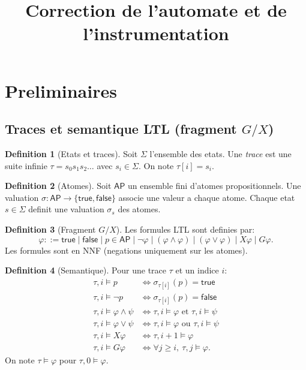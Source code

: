 \documentclass[11pt]{article}
\title{Correction de l'automate et de l'instrumentation}
\author{}
\date{}
\newcommand{\AP}{\mathsf{AP}}
\newcommand{\eval}{\models}
\theoremstyle{definition}
\newtheorem{definition}{Definition}
\begin{document}
\maketitle

\section{Preliminaires}

\subsection{Traces et semantique LTL (fragment $G/X$)}

\begin{definition}[Etats et traces]
Soit $\Sigma$ l'ensemble des etats. Une \emph{trace} est une suite infinie
$\tau = s_0 s_1 s_2 \ldots$ avec $s_i \in \Sigma$. On note $\tau[i] = s_i$.
\end{definition}

\begin{definition}[Atomes]
Soit $\AP$ un ensemble fini d'atomes propositionnels. Une valuation
$\sigma : \AP \to \{\mathsf{true},\mathsf{false}\}$ associe une valeur a chaque atome.
Chaque etat $s \in \Sigma$ definit une valuation $\sigma_s$ des atomes.
\end{definition}

\begin{definition}[Fragment $G/X$]
Les formules LTL sont definies par:
\[
\varphi ::= \mathsf{true} \mid \mathsf{false} \mid p \in \AP \mid \neg\varphi
\mid (\varphi \wedge \varphi) \mid (\varphi \vee \varphi)
\mid X\varphi \mid G\varphi.
\]
Les formules sont en NNF (negations uniquement sur les atomes).
\end{definition}

\begin{definition}[Semantique]
Pour une trace $\tau$ et un indice $i$:
\begin{align*}
\tau,i \eval p &\iff \sigma_{\tau[i]}(p) = \mathsf{true} \\
\tau,i \eval \neg p &\iff \sigma_{\tau[i]}(p) = \mathsf{false} \\
\tau,i \eval \varphi \wedge \psi &\iff \tau,i \eval \varphi \text{ et } \tau,i \eval \psi \\
\tau,i \eval \varphi \vee \psi &\iff \tau,i \eval \varphi \text{ ou } \tau,i \eval \psi \\
\tau,i \eval X\varphi &\iff \tau,i+1 \eval \varphi \\
\tau,i \eval G\varphi &\iff \forall j \ge i,\ \tau,j \eval \varphi.
\end{align*}
On note $\tau \eval \varphi$ pour $\tau,0 \eval \varphi$.
\end{definition}
\end{document}
